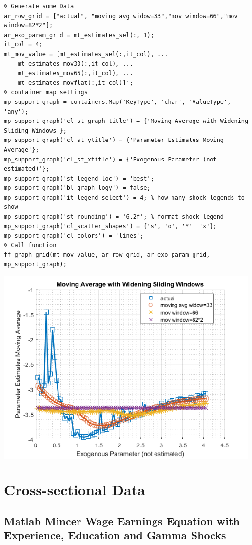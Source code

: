 \documentclass[
]{book}
\begin{document}
\begin{verbatim}
% Generate some Data
ar_row_grid = ["actual", "moving avg widow=33","mov window=66","mov window=82*2"];
ar_exo_param_grid = mt_estimates_sel(:, 1);
it_col = 4;
mt_mov_value = [mt_estimates_sel(:,it_col), ...
    mt_estimates_mov33(:,it_col), ...
    mt_estimates_mov66(:,it_col), ...
    mt_estimates_movflat(:,it_col)]'; 
% container map settings
mp_support_graph = containers.Map('KeyType', 'char', 'ValueType', 'any');
mp_support_graph('cl_st_graph_title') = {'Moving Average with Widening Sliding Windows'};
mp_support_graph('cl_st_ytitle') = {'Parameter Estimates Moving Average'};
mp_support_graph('cl_st_xtitle') = {'Exogenous Parameter (not estimated)'};
mp_support_graph('st_legend_loc') = 'best';
mp_support_graph('bl_graph_logy') = false;
mp_support_graph('it_legend_select') = 4; % how many shock legends to show
mp_support_graph('st_rounding') = '6.2f'; % format shock legend
mp_support_graph('cl_scatter_shapes') = {'s', 'o', '*', 'x'};
mp_support_graph('cl_colors') = 'lines';
% Call function
ff_graph_grid(mt_mov_value, ar_row_grid, ar_exo_param_grid, mp_support_graph);
\end{verbatim}

\includegraphics[width=5.20833in,height=\textheight]{img/fs_movingaverage_images/figure_0.png}

\hypertarget{cross-sectional-data}{%
\section{Cross-sectional Data}\label{cross-sectional-data}}

\hypertarget{matlab-mincer-wage-earnings-equation-with-experience-education-and-gamma-shocks}{%
\subsection{Matlab Mincer Wage Earnings Equation with Experience, Education and Gamma Shocks}\label{matlab-mincer-wage-earnings-equation-with-experience-education-and-gamma-shocks}}
\end{document}

